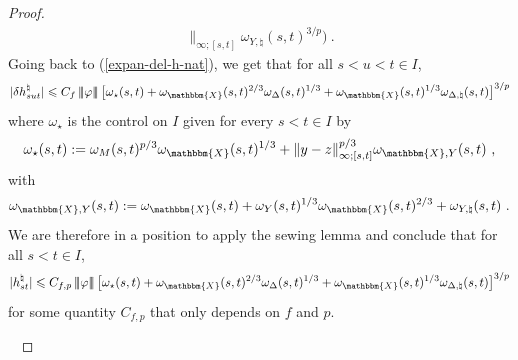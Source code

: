 \documentclass[11pt,reqno,oneside]{amsart}
\numberwithin{equation}{section}
\newcommand{\assign}{:=}
\newcommand{\normtrip}[1]{|\! |\!  | #1 | \! |\!  |}
\begin{document}
\begin{proof}
\begin{eqnarray*}
     \|_{\infty;[s,t]} \omega_{Y, \natural} (s, t)^{3 / p})\ . 
			\end{eqnarray*}
Going back to (\ref{expan-del-h-nat}), we get that for all $s<u<t\in I$,
  \[ | \delta h^{\natural}_{s u t} | \leqslant  C_{f}\, \normtrip{\varphi}\,  \big[ \omega_{\star} (s, t) +\omega_{\mathbbm{X}} (s, t)^{2 / 3} \omega_{\Delta} (s, t)^{1/3}+ \omega_{\mathbbm{X}} (s, t)^{1 / 3} \omega_{\Delta,
     \natural} (s, t)\big]^{3 / p} \]
  where $\omega_{\star}$ is the control on $I$ given for every $s< t \in I$ by
$$
	\omega_{\star} (s, t) \assign \omega_M (s, t)^{p / 3}
     \omega_{\mathbbm{X}} (s, t)^{1 / 3}\\
			+\| y - z\|_{\infty;[s,t]}^{p/3}\omega_{\mathbbm{X},Y}(s,t) \ ,
$$
with
		$$\omega_{\mathbbm{X},Y}(s,t)\assign  \omega_{\mathbbm{X}} (s, t) +\omega_Y (s, t)^{1/3} \omega_{\mathbbm{X}} (s, t)^{2
     / 3} +
     \omega_{Y, \natural} (s, t) \ .$$
 We are therefore in a position to apply the sewing lemma and conclude that for all $s<t\in I$, 
  \begin{equation}\label{preliminary-est-h-nat}
	| h^{\natural}_{st} | \leqslant  C_{f,p}\, \normtrip{\varphi}\,  \big[ \omega_{\star} (s, t) +\omega_{\mathbbm{X}} (s, t)^{2 / 3} \omega_{\Delta} (s, t)^{1/3}+ \omega_{\mathbbm{X}} (s, t)^{1 / 3} \omega_{\Delta,\natural} (s, t)\big]^{3 / p} 
		\end{equation}
  for some quantity $C_{f,p}$ that only depends on $f$ and $p$.

	
 	\
  

\end{proof}
\end{document}
